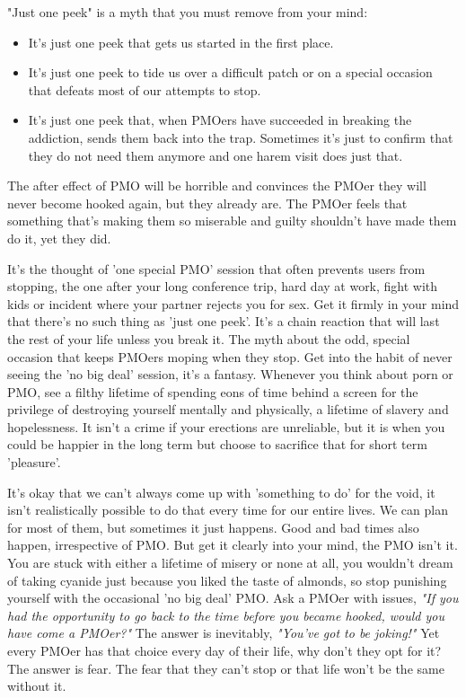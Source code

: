 \documentclass[easypeasy.tex]{subfiles}
\begin{document}
"Just one peek" is a myth that you must remove from your mind:
\begin{itemize}
  \item It's just one peek that gets us started in the first place.
  \item It's just one peek to tide us over a difficult patch or on a special occasion that defeats most of our attempts to stop.
  \item It's just one peek that, when PMOers have succeeded in breaking the addiction, sends them back into the trap. Sometimes it's just to confirm that they do not need them anymore and one harem visit does just that.
\end{itemize}
The after effect of PMO will be horrible and convinces the PMOer they will never become hooked again, but they already are. The PMOer feels that something that's making them so miserable and guilty shouldn't have made them do it, yet they did.

It's the thought of 'one special PMO' session that often prevents users from stopping, the one after your long conference trip, hard day at work, fight with kids or incident where your partner rejects you for sex. Get it firmly in your mind that there's no such thing as 'just one peek'. It's a chain reaction that will last the rest of your life unless you break it. The myth about the odd, special occasion that keeps PMOers moping when they stop. Get into the habit of never seeing the 'no big deal' session, it's a fantasy. Whenever you think about porn or PMO, see a filthy lifetime of spending eons of time behind a screen for the privilege of destroying yourself mentally and physically, a lifetime of slavery and hopelessness. It isn't a crime if your erections are unreliable, but it is when you could be happier in the long term but choose to sacrifice that for short term 'pleasure'.

It's okay that we can't always come up with 'something to do' for the void, it isn't realistically possible to do that every time for our entire lives. We can plan for most of them, but sometimes it just happens. Good and bad times also happen, irrespective of PMO. But get it clearly into your mind, the PMO isn't it. You are stuck with either a lifetime of misery or none at all, you wouldn't dream of taking cyanide just because you liked the taste of almonds, so stop punishing yourself with the occasional 'no big deal' PMO. Ask a PMOer with issues, \textit{"If you had the opportunity to go back to the time before you became hooked, would you have come a PMOer?"} The answer is inevitably, \textit{"You've got to be joking!"} Yet every PMOer has that choice every day of their life, why don't they opt for it? The answer is fear. The fear that they can't stop or that life won't be the same without it.
\end{document}
